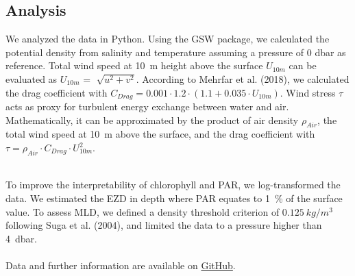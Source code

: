 \documentclass[../Main.tex]{subfiles}
\begin{document}
\subsection*{\crule[blue]{.2cm}{.2cm} Analysis}
We analyzed the data in Python. 
Using the GSW package, we calculated the potential density from salinity and temperature assuming a pressure of 0 dbar as reference\supercite{gsw}. 
Total wind speed at \SI{10}{m} height above the surface $U_{10m}$ can be evaluated as $U_{10m}$ = $\sqrt[]{u^2 + v^2}$. 
According to Mehrfar et al. (2018)\supercite{Mehrfar2018}, we calculated the drag coefficient with $C_{Drag} = 0.001\cdot1.2\cdot  (1.1+0.035\cdot U_{10m})$. 
Wind stress $\tau$ acts as proxy for turbulent energy exchange between water and air.
Mathematically, it can be approximated by the product of air density $\rho_{Air}$, the total wind speed at \SI{10}{m} above the surface, and the drag coefficient with $\tau = \rho_{Air}\cdot C_{Drag}\cdot U_{10m}^2$\supercite{Mehrfar2018}.

\\
To improve the interpretability of chlorophyll and PAR, we log-transformed the data.
We estimated the EZD in depth where PAR equates to \SI{1}{\%} of the surface value\supercite{Lee2007}.
To assess MLD, we defined a density threshold criterion of $\SI{0.125}{kg/m^3}$ following Suga et al. (2004)\supercite{Suga2004}, and limited the data to a pressure higher than \SI{4}{dbar}. 
\\
\\
Data and further information are available on \href{https://github.com/joaldi2208/BloomDynamics}{GitHub}.
\end{document}
